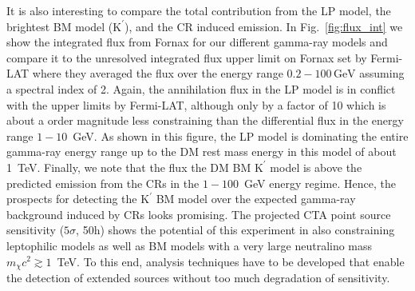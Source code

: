 \documentclass[10pt,aps,pra,reprint,amsmath,amsfonts,amssymb,showpacs,nofootinbib,floatfix]{revtex4-1}
\newcommand{\rmn}{\mathrm}
\newcommand{\Kp}{\rmn{K}^\prime}
\newcommand{\gev}{\rmn{GeV}}
\begin{document}
It is also interesting to compare the total contribution from the LP
model, the brightest BM model ($\Kp$), and the CR induced emission. In
Fig.~\ref{fig:flux_int} we show the integrated flux from Fornax for
our different gamma-ray models and compare it to the unresolved
integrated flux upper limit on Fornax set by Fermi-LAT where they
averaged the flux over the energy range $0.2-100\,\gev$ assuming a
spectral index of 2. Again, the annihilation flux in the LP model is
in conflict with the upper limits by Fermi-LAT, although only by a
factor of 10 which is about a order magnitude less constraining than
the differential flux in the energy range $1-10$~GeV. As shown in this
figure, the LP model is dominating the entire gamma-ray energy range
up to the DM rest mass energy in this model of about 1~TeV. Finally,
we note that the flux the DM BM $\Kp$ model is above the predicted
emission from the CRs in the $1-100$~GeV energy regime. Hence, the
prospects for detecting the $\Kp$ BM model over the expected gamma-ray
background induced by CRs looks promising. The projected CTA point
source sensitivity ($5\sigma$, 50h) shows the potential of this
experiment in also constraining leptophilic models as well as BM
models with a very large neutralino mass $m_\chi c^2 \gtrsim
1$~TeV. To this end, analysis techniques have to be developed that
enable the detection of extended sources without too much degradation
of sensitivity.
\end{document}
